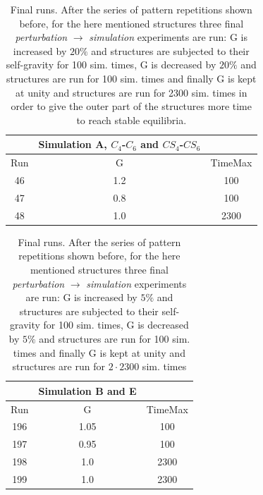 \begin{table}[!htbp]
\centering
\begin{tabular}{|c|c|c|}
\hline
            & Simulation A, $C_4$-$C_6$ and $CS_4$-$CS_6$ &             \\ \hline
 Run        &     G                                       &  TimeMax    \\ \hline
 46         &    1.2                                      &    100      \\ \hline
 47         &    0.8                                      &    100      \\ \hline
 48         &    1.0                                      &    2300     \\ \hline   
\end{tabular}
\caption {Final runs. After the series of pattern repetitions shown before, for the here mentioned structures three final \textit{perturbation} $\rightarrow$ \textit{simulation} experiments are run: G is increased by $20 \%$ and structures are subjected to their self-gravity for 100 sim. times, G is decreased by $20 \%$ and structures are run for 100 sim. times and finally G is kept at unity and structures are run for 2300 sim. times in order to give the outer part of the structures more time to reach stable equilibria.}
\end{table}

\begin{table}[!htbp]
\centering
\begin{tabular}{|c|c|c|}
\hline
            & Simulation B and E &             \\ \hline
 Run        &     G              &  TimeMax    \\ \hline
 196        &    1.05            &    100      \\ \hline
 197        &    0.95            &    100      \\ \hline
 198        &    1.0             &    2300     \\ \hline   
 199        &    1.0             &    2300     \\ \hline  
\end{tabular}
\caption {Final runs. After the series of pattern repetitions shown before, for the here mentioned structures three final \textit{perturbation} $\rightarrow$ \textit{simulation} experiments are run: G is increased by $5 \%$ and structures are subjected to their self-gravity for 100 sim. times, G is decreased by $5 \%$ and structures are run for 100 sim. times and finally G is kept at unity and structures are run for $2\cdot 2300$ sim. times}
\end{table}

